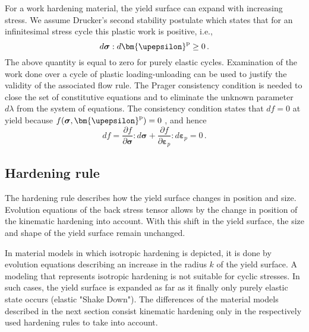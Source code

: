 For a work hardening material, the yield surface can expand with increasing stress.
We assume Drucker's second stability postulate which states that for an infinitesimal stress cycle this plastic work is positive, i.e.,
\begin{equation}
d\boldsymbol{\sigma}: d{{\bm{\upepsilon }}^{\rm{p}}} \ge 0 \,.
\end{equation}
The above quantity is equal to zero for purely elastic cycles.
Examination of the work done over a cycle of plastic loading-unloading can be used to justify the validity of the associated flow rule.
The Prager consistency condition is needed to close the set of constitutive equations and to eliminate the unknown parameter $d\lambda$ from the system of equations.
The consistency condition states that $df = 0$  at yield because  $f(\boldsymbol{\sigma},{{\bm{\upepsilon }}^{\rm{p}}}) = 0$ , and hence
\begin{equation}
df = \frac{\partial f}{\partial \boldsymbol{\sigma}}:d\boldsymbol{\sigma} + \frac{\partial f}{\partial \boldsymbol{\varepsilon}_p}:d\boldsymbol{\varepsilon}_p = 0 \,.
\end{equation}

\subsection{Hardening rule}
\noindent
The hardening rule describes how the yield surface changes in position and size.
Evolution equations of the back stress tensor allows by the change in position of the kinematic hardening into account.
With this shift in the yield surface, the size and shape of the yield surface remain unchanged.

In material models in which isotropic hardening is depicted, it is done by evolution equations describing an increase in the radius $k$ of the yield surface.
A modeling that represents isotropic hardening is not suitable for cyclic stresses.
In such cases, the yield surface is expanded as far as it finally only purely elastic state occurs (elastic "Shake Down").
The differences of the material models described in the next section consist kinematic hardening only in the respectively used hardening rules to take into account.

